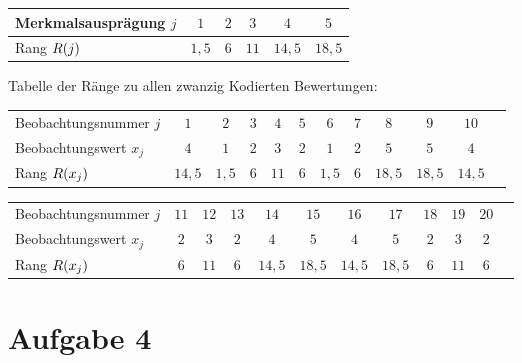 \documentclass{exercise}
\begin{document}
\begin{enumerate}
\begin{center}
\begin{tabular}{lccccc}
                Merkmalsausprägung \(j\) & \(1\) & \(2\) & \(3\) & \(4\) & \(5\)\\
                \midrule
                Rang \(R\parentheses*{j}\) & \(1,5\) & \(6\) & \(11\) & \(14,5\) & \(18,5\)\\
                \bottomrule
            \end{tabular}
        \end{center}
        Tabelle der Ränge zu allen zwanzig Kodierten Bewertungen:
        \begin{center}
            \begin{tabular}{lccccccccccc}
                \toprule
                Beobachtungsnummer \(j\) & \(1\) & \(2\) & \(3\) & \(4\) & \(5\) & \(6\) & \(7\) & \(8\) & \(9\) & \(10\)\\
                Beobachtungswert \(x_j\) & \(4\) & \(1\) & \(2\) & \(3\) & \(2\) & \(1\) & \(2\) & \(5\) & \(5\) & \(4\)\\
                \midrule
                Rang \(R\parentheses*{x_j}\) & \(14,5\) & \(1,5\) & \(6\) & \(11\) & \(6\) & \(1,5\) & \(6\) & \(18,5\) & \(18,5\) & \(14,5\)\\
                \bottomrule
            \end{tabular}
        \end{center}
        \begin{center}
            \begin{tabular}{lccccccccccc}
                \toprule
                Beobachtungsnummer \(j\) & \(11\) & \(12\) & \(13\) & \(14\) & \(15\) & \(16\) & \(17\) & \(18\) & \(19\) & \(20\)\\
                Beobachtungswert \(x_j\) & \(2\) & \(3\) & \(2\) & \(4\) & \(5\) & \(4\) & \(5\) & \(2\) & \(3\) & \(2\)\\
                \midrule
                Rang \(R\parentheses*{x_j}\) & \(6\) & \(11\) & \(6\) & \(14,5\) & \(18,5\) & \(14,5\) & \(18,5\) & \(6\) & \(11\) & \(6\)\\
                \bottomrule
            \end{tabular}
        \end{center}
    \end{enumerate}


    \section*{Aufgabe 4}
\end{document}
